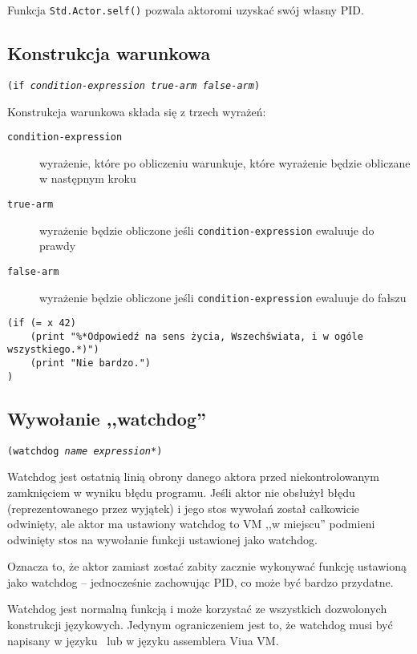 Funkcja \texttt{Std.Actor.self()} pozwala aktoromi uzyskać swój własny PID.

\subsection{Konstrukcja warunkowa}

\texttt{(if \emph{condition-expression} \emph{true-arm} \emph{false-arm})}
\newline

Konstrukcja warunkowa składa się z trzech wyrażeń:

\begin{description}
    \item[\texttt{condition-expression}] wyrażenie, które po obliczeniu warunkuje, które wyrażenie będzie
        obliczane w następnym kroku
    \item[\texttt{true-arm}] wyrażenie będzie obliczone jeśli \texttt{condition-expression} ewaluuje do prawdy
    \item[\texttt{false-arm}] wyrażenie będzie obliczone jeśli \texttt{condition-expression} ewaluuje do
        fałszu
\end{description}

\begin{lstlisting}
(if (= x 42)
    (print "%*Odpowiedź na sens życia, Wszechświata, i w ogóle wszystkiego.*)")
    (print "Nie bardzo.")
)
\end{lstlisting}

\subsection{Wywołanie ,,watchdog''}
\label{viuact_spec_watchdog_call}

\texttt{(watchdog \emph{name} \emph{expression}*)}
\newline

Watchdog jest ostatnią linią obrony danego aktora przed niekontrolowanym zamknięciem w wyniku błędu programu.
Jeśli aktor nie obsłużył błędu (reprezentowanego przez wyjątek) i jego stos wywołań został całkowicie
odwinięty, ale aktor ma ustawiony watchdog to VM ,,w miejscu'' podmieni odwinięty stos na wywołanie funkcji
ustawionej jako watchdog.

Oznacza to, że aktor zamiast zostać zabity zacznie wykonywać funkcję ustawioną jako watchdog -- jednocześnie
zachowując PID, co może być bardzo przydatne.

Watchdog jest normalną funkcją i może korzystać ze wszystkich dozwolonych konstrukcji językowych.
Jedynym ograniczeniem jest to, że watchdog musi być napisany w języku \ViuAct\ lub w języku assemblera Viua VM.

